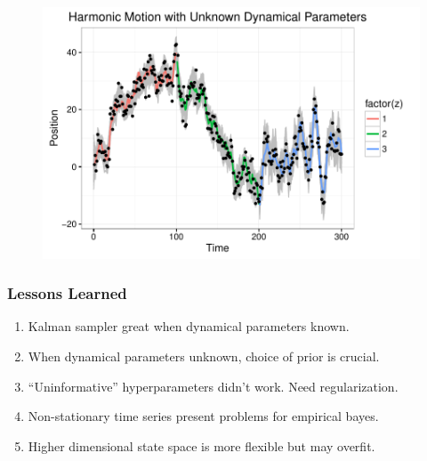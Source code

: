 \documentclass{beamer}
\begin{document}
\begin{frame}
\begin{figure}
  \centering
  \includegraphics[width = 1\linewidth]{"./plot/lds/04_harmonic_unknown"}
\end{figure}
\end{frame}

\begin{frame}
\frametitle{Lessons Learned}
\begin{enumerate}
\item Kalman sampler great when dynamical parameters known.
\item When dynamical parameters unknown, choice of prior is crucial.
\item ``Uninformative'' hyperparameters didn't work. Need regularization.
\item Non-stationary time series present problems for empirical bayes.
\item Higher dimensional state space is more flexible but may overfit.
\end{enumerate}
\end{frame}
\end{document}

